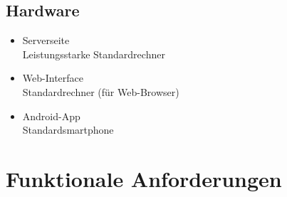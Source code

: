 \documentclass[a4paper]{scrreprt}
\begin{document}
        \section{Hardware}
            \begin{itemize}
                \item Serverseite\\
                    Leistungsstarke Standardrechner
                \item  \gls{Web-Interface}\\
                    Standardrechner (für Web-Browser)
                \item \gls{Android-App}\\
                    Standardsmartphone
            \end{itemize}

    \chapter{Funktionale Anforderungen}

\end{document}
